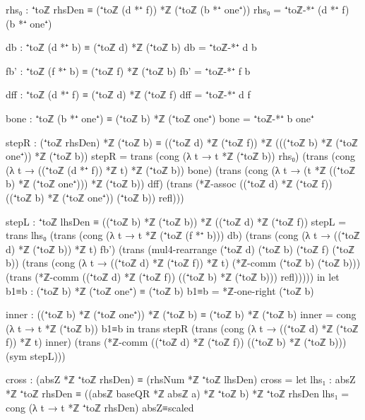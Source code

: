 \documentclass[11pt,a4paper]{book}
\begin{document}
\begin{code}
        rhs₀ : ⁺toℤ rhsDen ≡ (⁺toℤ (d *⁺ f)) *ℤ (⁺toℤ (b *⁺ one⁺))
        rhs₀ = ⁺toℤ-*⁺ (d *⁺ f) (b *⁺ one⁺)

        db : ⁺toℤ (d *⁺ b) ≡ (⁺toℤ d) *ℤ (⁺toℤ b)
        db = ⁺toℤ-*⁺ d b

        fb' : ⁺toℤ (f *⁺ b) ≡ (⁺toℤ f) *ℤ (⁺toℤ b)
        fb' = ⁺toℤ-*⁺ f b

        dff : ⁺toℤ (d *⁺ f) ≡ (⁺toℤ d) *ℤ (⁺toℤ f)
        dff = ⁺toℤ-*⁺ d f

        bone : ⁺toℤ (b *⁺ one⁺) ≡ (⁺toℤ b) *ℤ (⁺toℤ one⁺)
        bone = ⁺toℤ-*⁺ b one⁺

        stepR : (⁺toℤ rhsDen) *ℤ (⁺toℤ b) ≡ ((⁺toℤ d) *ℤ (⁺toℤ f)) *ℤ (((⁺toℤ b) *ℤ (⁺toℤ one⁺)) *ℤ (⁺toℤ b))
        stepR =
          trans
            (cong (λ t → t *ℤ (⁺toℤ b)) rhs₀)
            (trans
              (cong (λ t → ((⁺toℤ (d *⁺ f)) *ℤ t) *ℤ (⁺toℤ b)) bone)
              (trans
                (cong (λ t → (t *ℤ ((⁺toℤ b) *ℤ (⁺toℤ one⁺))) *ℤ (⁺toℤ b)) dff)
                (trans
                  (*ℤ-assoc ((⁺toℤ d) *ℤ (⁺toℤ f)) ((⁺toℤ b) *ℤ (⁺toℤ one⁺)) (⁺toℤ b))
                  refl)))

        stepL : ⁺toℤ lhsDen ≡ ((⁺toℤ b) *ℤ (⁺toℤ b)) *ℤ ((⁺toℤ d) *ℤ (⁺toℤ f))
        stepL =
          trans
            lhs₀
            (trans
              (cong (λ t → t *ℤ (⁺toℤ (f *⁺ b))) db)
              (trans
                (cong (λ t → ((⁺toℤ d) *ℤ (⁺toℤ b)) *ℤ t) fb')
                (trans
                  (mul4-rearrange (⁺toℤ d) (⁺toℤ b) (⁺toℤ f) (⁺toℤ b))
                  (trans
                    (cong (λ t → ((⁺toℤ d) *ℤ (⁺toℤ f)) *ℤ t) (*ℤ-comm (⁺toℤ b) (⁺toℤ b)))
                    (trans
                      (*ℤ-comm ((⁺toℤ d) *ℤ (⁺toℤ f)) ((⁺toℤ b) *ℤ (⁺toℤ b)))
                      refl)))))
      in
      let
        b1≡b : (⁺toℤ b) *ℤ (⁺toℤ one⁺) ≡ (⁺toℤ b)
        b1≡b = *ℤ-one-right (⁺toℤ b)

        inner : ((⁺toℤ b) *ℤ (⁺toℤ one⁺)) *ℤ (⁺toℤ b) ≡ (⁺toℤ b) *ℤ (⁺toℤ b)
        inner = cong (λ t → t *ℤ (⁺toℤ b)) b1≡b
      in
      trans
        stepR
        (trans
          (cong (λ t → ((⁺toℤ d) *ℤ (⁺toℤ f)) *ℤ t) inner)
          (trans
            (*ℤ-comm ((⁺toℤ d) *ℤ (⁺toℤ f)) ((⁺toℤ b) *ℤ (⁺toℤ b)))
            (sym stepL)))

    cross : (absZ *ℤ ⁺toℤ rhsDen) ≡ (rhsNum *ℤ ⁺toℤ lhsDen)
    cross =
      let
        lhs₁ : absZ *ℤ ⁺toℤ rhsDen ≡ ((absℤ baseQR *ℤ absℤ a) *ℤ ⁺toℤ b) *ℤ ⁺toℤ rhsDen
        lhs₁ = cong (λ t → t *ℤ ⁺toℤ rhsDen) absZ≡scaled


\end{code}
\end{document}

